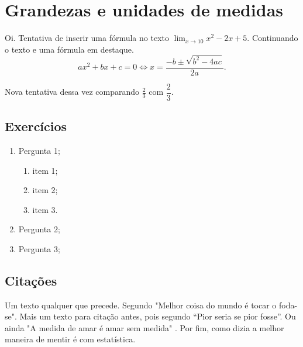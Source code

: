 \chapter{Grandezas e unidades de medidas}

\par Oi. Tentativa de inserir uma fórmula no texto $\displaystyle \lim_{x\rightarrow 10} x^2-2x+5$. Continuando o texto e uma fórmula em destaque. $$ax^2+bx+c=0 \Leftrightarrow x=\frac{-b \pm \sqrt{b^2-4ac}}{2a}.$$

\par Nova tentativa dessa vez comparando $\frac{2}{3}$ com $\dfrac{2}{3}$.

\section{Exercícios}
\begin{enumerate}[label=\textbf{\arabic*}.]
    \item Pergunta 1;
    \begin{enumerate}[label=\alph*)]
        \item item 1;
        \item item 2;
        \item item 3.
    \end{enumerate}
    \item Pergunta 2;
    \item Pergunta 3;
\end{enumerate}

\section{Citações}
Um texto qualquer que precede. Segundo \citet[p. 19]{manson2017sutil} "Melhor coisa do mundo é tocar o foda-se". Mais um texto para citação antes, pois segundo \citet[p. 10]{fabiodantas} ``Pior seria se pior fosse''. Ou ainda "A medida de amar é amar sem medida" \citep[p. 12]{fabiodantas}. Por fim, como dizia \citet[p. 8]{huff2016mentir} a melhor maneira de mentir é com estatística.

